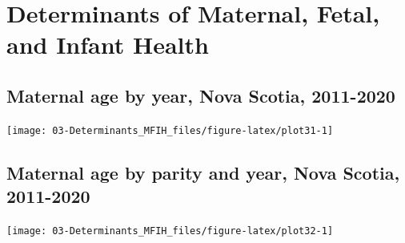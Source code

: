 \documentclass[
]{krantz}
\begin{document}
\hypertarget{section-3}{%
\chapter{Determinants of Maternal, Fetal, and Infant Health}\label{section-3}}

\hypertarget{section-31}{%
\section{Maternal age by year, Nova Scotia, 2011-2020}\label{section-31}}

\begin{center}\texttt{[image: 03-Determinants\_MFIH\_files/figure-latex/plot31-1]} \end{center}

\begin{table}[H]
\centering
{}
\end{table}

\hypertarget{section-32}{%
\section{Maternal age by parity and year, Nova Scotia, 2011-2020}\label{section-32}}

\begin{center}\texttt{[image: 03-Determinants\_MFIH\_files/figure-latex/plot32-1]} \end{center}
\end{document}
